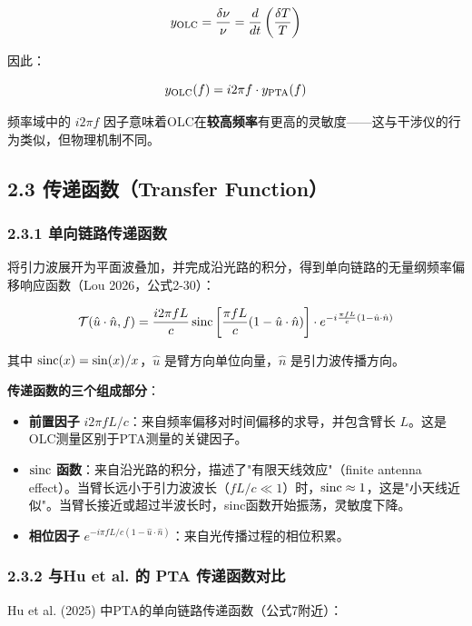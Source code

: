 \documentclass[12pt,a4paper]{article}
\begin{document}
$$y_{\rm OLC} = \frac{\delta\nu}{\nu} = \frac{d}{dt}\left(\frac{\delta T}{T}\right)$$

因此：

$$y_{\rm OLC}(f) = i2\pi f \cdot y_{\rm PTA}(f)$$

频率域中的 $i2\pi f$ 因子意味着OLC在\textbf{较高频率}有更高的灵敏度——这与干涉仪的行为类似，但物理机制不同。

\subsection{2.3 传递函数（Transfer Function）}


\subsubsection{2.3.1 单向链路传递函数}


将引力波展开为平面波叠加，并完成沿光路的积分，得到单向链路的无量纲频率偏移响应函数（Lou 2026，公式2-30）\cite{ref10}：

$$\mathcal{T}(\hat{u}\cdot\hat{n}, f) = \frac{i2\pi f L}{c}\, {\rm sinc}\left[\frac{\pi f L}{c}(1 - \hat{u}\cdot\hat{n})\right] \cdot e^{-i\frac{\pi f L}{c}(1 - \hat{u}\cdot\hat{n})}$$

其中 ${\rm sinc}(x) = \sin(x)/x$，$\hat{u}$ 是臂方向单位向量，$\hat{n}$ 是引力波传播方向。

\textbf{传递函数的三个组成部分}：

\begin{itemize}
  \item[1] \textbf{前置因子} $i2\pi f L/c$：来自频率偏移对时间偏移的求导，并包含臂长 $L$。这是OLC测量区别于PTA测量的关键因子。

  \item[2] \textbf{${\rm sinc}$ 函数}：来自沿光路的积分，描述了"有限天线效应"（finite antenna effect）。当臂长远小于引力波波长（$fL/c \ll 1$）时，${\rm sinc} \approx 1$，这是"小天线近似"。当臂长接近或超过半波长时，sinc函数开始振荡，灵敏度下降。

  \item[3] \textbf{相位因子} $e^{-i\pi f L/c(1-\hat{u}\cdot\hat{n})}$：来自光传播过程的相位积累。

\end{itemize}
\subsubsection{2.3.2 与Hu et al. 的 PTA 传递函数对比}


Hu et al. (2025) 中PTA的单向链路传递函数（公式7附近）\cite{ref9}：
\end{document}
